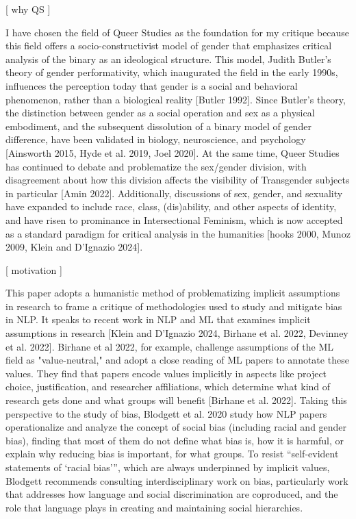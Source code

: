 \documentclass[11pt]{article}
\begin{document}
[ why QS ]

I have chosen the field of Queer Studies as the foundation for my
critique because this field offers a socio-constructivist model of
gender that emphasizes critical analysis of the binary as an
ideological structure. This model, Judith Butler's theory of gender
performativity, which inaugurated the field in the early 1990s,
influences the perception today that gender is a social and behavioral
phenomenon, rather than a biological reality [Butler 1992]. Since
Butler's theory, the distinction between gender as a social operation
and sex as a physical embodiment, and the subsequent dissolution of a
binary model of gender difference, have been validated in biology,
neuroscience, and psychology [Ainsworth 2015, Hyde et al. 2019, Joel
2020]. At the same time, Queer Studies has continued to debate and
problematize the sex/gender division, with disagreement about how this
division affects the visibility of Transgender subjects in particular
[Amin 2022]. Additionally, discussions of sex, gender, and sexuality
have expanded to include race, class, (dis)ability, and other aspects
of identity, and have risen to prominance in Intersectional Feminism,
which is now accepted as a standard paradigm for critical analysis in
the humanities [hooks 2000, Munoz 2009, Klein and D'Ignazio 2024].

[ motivation ]

This paper adopts a humanistic method of problematizing implicit
assumptions in research to frame a critique of methodologies used to
study and mitigate bias in NLP. It speaks to recent work in NLP and ML
that examines implicit assumptions in research [Klein and D'Ignazio
2024, Birhane et al. 2022, Devinney et al. 2022]. Birhane et al 2022,
for example, challenge assumptions of the ML field as "value-neutral,"
and adopt a close reading of ML papers to annotate these values. They
find that papers encode values implicitly in aspects like project
choice, justification, and researcher affiliations, which determine
what kind of research gets done and what groups will benefit [Birhane
et al. 2022]. Taking this perspective to the study of bias, Blodgett
et al. 2020 study how NLP papers operationalize and analyze the
concept of social bias (including racial and gender bias), finding
that most of them do not define what bias is, how it is harmful, or
explain why reducing bias is important, for what groups. To resist
“self-evident statements of ‘racial bias’”, which are always
underpinned by implicit values, Blodgett recommends consulting
interdisciplinary work on bias, particularly work that addresses how
language and social discrimination are coproduced, and the role that
language plays in creating and maintaining social hierarchies.
\end{document}
